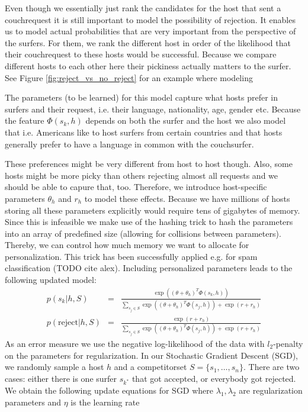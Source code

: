 Even though we essentially just rank the candidates for the host that sent a couchrequest it is still important to model the possibility of rejection. It enables us to model actual probabilities that are very important from the perspective of the surfers. For them, we rank the different host in order of the likelihood that their couchrequest to these hosts would be successful. Because we compare different hosts to each other here their pickiness actually matters to the surfer. See Figure \ref{fig:reject_vs_no_reject} for an example where modeling 

The parameters (to be learned) for this model capture what hosts prefer in surfers and their request, i.e. their language, nationality, age, gender etc. Because the feature $\Phi(s_k,h)$ depends on both the surfer and the host we also model that i.e. Americans like to host surfers from certain countries and that hosts generally prefer to have a language in common with the couchsurfer.

These preferences might be very different from host to host though. Also, some hosts might be more picky than others rejecting almost all requests and we should be able to capure that, too. Therefore, we introduce host-specific parameters $\theta_h$ and $r_h$ to model these effects. Because we have millions of hosts storing all these parameters explicitly would require tens of gigabytes of memory. %
Since this is infeasible we make use of the hashing trick to hash the parameters into an array of predefined size (allowing for collisions between parameters). Thereby, we can control how much memory we want to allocate for personalization. This trick has been successfully applied e.g. for spam classification (TODO cite alex).
Including personalized parameters leads to the following updated model:
\begin{eqnarray}
p(s_k | h, S) &=& \frac{\exp((\theta + \theta_h)^T \Phi(s_k,h))}{\sum_{s_j \in S} \exp((\theta + \theta_h)^T \Phi(s_j,h)) + \exp(r + r_{h})} \\
p(\text{reject} | h, S) &=& \frac{\exp(r+r_{h})}{\sum_{s_j \in S} \exp((\theta + \theta_h)^T \Phi(s_j,h)) + \exp(r + r_{h})}
\end{eqnarray}
As an error measure we use the negative log-likelihood of the data with $l_2$-penalty on the parameters for regularization. In our Stochastic Gradient Descent (SGD), we randomly sample a host $h$ and a competitorset $S=\{ s_1, \dots, s_n\}$. There are two cases: either there is one surfer $s_{k^*}$ that got accepted, or everybody got rejected. We obtain the following update equations for SGD where $\lambda_1, \lambda_2$ are regularization parameters and $\eta$ is the learning rate


